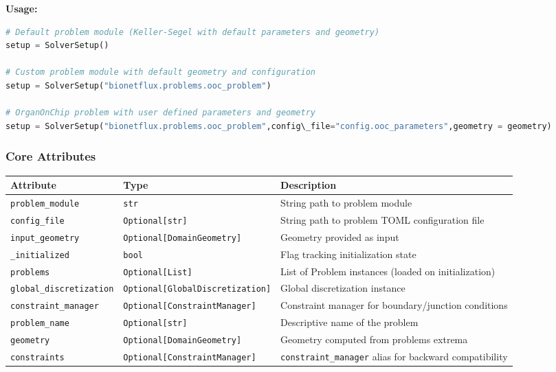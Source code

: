 \textbf{Usage:}
\begin{lstlisting}[language=Python, caption=Constructor Usage Examples]
# Default problem module (Keller-Segel with default parameters and geometry)
setup = SolverSetup()

# Custom problem module with default geometry and configuration
setup = SolverSetup("bionetflux.problems.ooc_problem")

# OrganOnChip problem with user defined parameters and geometry
setup = SolverSetup("bionetflux.problems.ooc_problem",config\_file="config.ooc_parameters",geometry = geometry)
\end{lstlisting}

\subsubsection{Core Attributes}

\begin{longtable}{|p{4.1cm}|p{5.8cm}|p{4cm}|}
\hline
\textbf{Attribute} & \textbf{Type} & \textbf{Description} \\
\hline
\endhead

\texttt{problem\_module} & \texttt{str} & String path to problem module \\
\hline

\texttt{config\_file} & \texttt{Optional[str]} & String path to problem TOML configuration file \\
\hline

\texttt{input\_geometry} & \texttt{Optional[DomainGeometry]} & Geometry provided as input \\
\hline

\texttt{\_initialized} & \texttt{bool} & Flag tracking initialization state \\
\hline

\texttt{problems} & \texttt{Optional[List]} & List of Problem instances (loaded on initialization) \\
\hline

\texttt{global\_discretization} & \texttt{Optional[GlobalDiscretization]} & Global discretization instance \\
\hline

\texttt{constraint\_manager} & \texttt{Optional[ConstraintManager]} & Constraint manager for boundary/junction conditions \\
\hline

\texttt{problem\_name} & \texttt{Optional[str]} & Descriptive name of the problem \\
\hline

\texttt{geometry} & \texttt{Optional[DomainGeometry]} & Geometry computed from problems extrema \\
\hline

\texttt{constraints} & \texttt{Optional[ConstraintManager]} & \texttt{constraint\_manager} alias for backward compatibility \\
\hline

\end{longtable}

